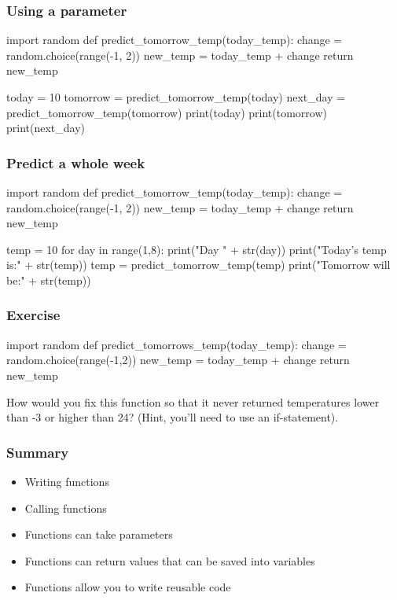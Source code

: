 \documentclass{beamer}
\begin{document}
\begin{frame}[fragile]
\frametitle{Using a parameter}
\begin{shaded}
\begin{code}
import random
def predict_tomorrow_temp(today_temp):
   change = random.choice(range(-1, 2))
   new_temp = today_temp + change
   return new_temp

today = 10
tomorrow = predict_tomorrow_temp(today)
next_day = predict_tomorrow_temp(tomorrow)
print(today)
print(tomorrow)
print(next_day)
\end{code}
\end{shaded}
\end{frame}

\begin{frame}[fragile]
\frametitle{Predict a whole week}
\begin{shaded}
\begin{code}
import random
def predict_tomorrow_temp(today_temp):
   change = random.choice(range(-1, 2))
   new_temp = today_temp + change
   return new_temp

temp = 10
for day in range(1,8):
   print("Day " + str(day))
   print("Today's temp is:" + str(temp))
   temp = predict_tomorrow_temp(temp)
   print("Tomorrow will be:" + str(temp))
\end{code}
\end{shaded}
\end{frame}

\begin{frame}[fragile]
\frametitle{Exercise}
\begin{shaded}
\begin{code}
import random
def predict_tomorrows_temp(today_temp):
   change = random.choice(range(-1,2))
   new_temp = today_temp + change
   return new_temp
\end{code}
\end{shaded}

How would you fix this function so that it never returned
temperatures lower than -3 or higher than 24? (Hint, you'll
need to use an if-statement).
\end{frame}

\begin{frame}
\frametitle{Summary}
\begin{itemize}
\item Writing functions
\item Calling functions
\item Functions can take parameters
\item Functions can return values that can be saved into variables
\item Functions allow you to write reusable code
\end{itemize}
\end{frame}
\end{document}
